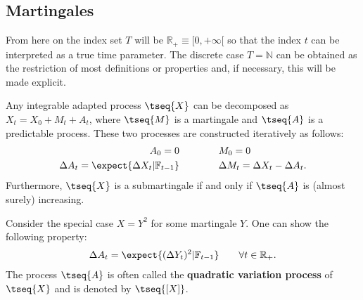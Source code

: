 \subsection{Martingales}

    From here on the index set $T$ will be $\mathbb{R}_+\equiv[0,+\infty[$ so that the index $t$ can be interpreted as a true time parameter. The discrete case $T=\mathbb{N}$ can be obtained as the restriction of most definitions or properties and, if necessary, this will be made explicit.


    \begin{theorem}
        Any integrable adapted process $\tseq{X}$ can be decomposed as $X_t=X_0+M_t+A_t$, where $\tseq{M}$ is a martingale and $\tseq{A}$ is a predictable process. These two processes are constructed iteratively as follows:
        \begin{align}
            A_0 = 0\qquad&\qquad M_0 = 0\\
            \Delta A_t = \expect{\Delta X_t|\mathbb{F}_{t-1}}\qquad&\qquad\Delta M_t = \Delta X_t - \Delta A_t.
        \end{align}
        Furthermore, $\tseq{X}$ is a submartingale if and only if $\tseq{A}$ is (almost surely) increasing.
    \end{theorem}
    \begin{result}
        Consider the special case $X=Y^2$ for some martingale $Y$. One can show the following property:
        \begin{gather}
            \Delta A_t = \expect{(\Delta Y_t)^2|\mathbb{F}_{t-1}}\qquad\forall t\in\mathbb{R}_+.
        \end{gather}
        The process $\tseq{A}$ is often called the \textbf{quadratic variation process} of $\tseq{X}$ and is denoted by $\tseq{[X]}$.
    \end{result}

